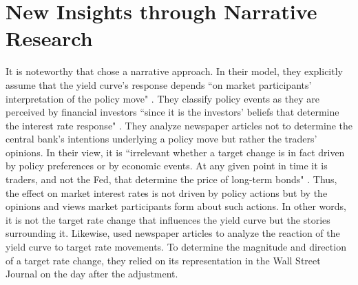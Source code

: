 \documentclass[11pt,a4paper,english,oneside]{book}
\numberwithin{equation}{chapter}
\begin{document}
%
%

%
%
%
%
%

\section{New Insights through Narrative Research} \label{NewInsights}

It is noteworthy that \cite{Ellingsen.2003} chose a narrative approach. In their model, they explicitly assume that the yield curve's response depends ``on market participants’ interpretation of the policy move" \citep[~p. 1603]{Ellingsen.2001}. They classify policy events as they are perceived by financial investors ``since it is the investors’ beliefs that determine the interest rate response" \citep[~p. 1604]{Ellingsen.2001}. They analyze newspaper articles not to determine the central bank's intentions underlying a policy move but rather the traders' opinions. In their view, it is ``irrelevant whether a target change is in fact driven by policy preferences or by economic events. At any given point in time it is traders, and not the Fed, that determine the price of long-term bonds" \cite[~p. 2]{Ellingsen.2003}. Thus, the effect on market interest rates is not driven by policy actions but by the opinions and views market participants form about such actions. In other words, it is not the target rate change that influences the yield curve but the stories surrounding it.
Likewise, \cite{Cook.1989} used newspaper articles to analyze the reaction of the yield curve to target rate movements. To determine the magnitude and direction of a target rate change, they relied on its representation in the Wall Street Journal on the day after the adjustment. %
\end{document}
